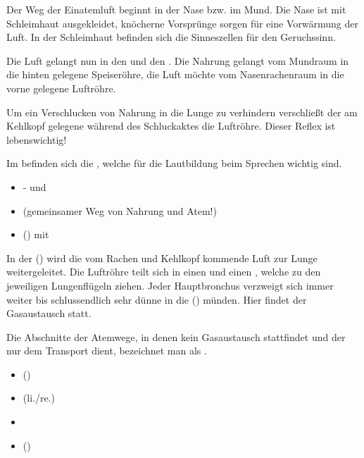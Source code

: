 {%
Der Weg der Einatemluft beginnt in der Nase bzw. im Mund. Die Nase ist
mit Schleimhaut ausgekleidet, knöcherne Vorsprünge sorgen für
eine Vorwärmung der Luft. In der Schleimhaut be\-finden sich die
Sinneszellen für den Geruchssinn. 


Die Luft gelangt nun in den  und den
.  Die Nahrung gelangt vom Mundraum in die
hinten gelegene Speiseröhre, die Luft möchte vom Nasen\-rachen\-raum in die vorne gelegene Luftröhre. 

Um ein Verschlucken von Nahrung in die Lunge zu verhindern
verschließt der am Kehlkopf gelegene 
während des Schluckaktes die Luftröhre. Dieser Reflex ist lebenswichtig! 

Im   befinden sich die ,
welche für die Lautbildung beim Sprechen wichtig sind.
}{%
\begin{itemize}
    \item {}- und   
    \item {} (gemeinsamer Weg von Nahrung und
    Atem!)  
    \item {} () mit
       
\end{itemize}
}{}{}{}

{%
In der  () wird die vom Rachen
und Kehlkopf kommende Luft zur Lunge weitergeleitet. Die Luftröhre teilt sich in einen
 und einen  ,
welche zu den jeweiligen Lungenflügeln ziehen. Jeder Hauptbronchus verzweigt sich immer weiter
bis schlussendlich sehr dünne  in die
 () münden. Hier findet
der Gasaustausch statt.

Die Abschnitte der Atemwege, in denen kein Gasaustausch
stattfindet und der nur dem Transport dient, bezeichnet man
als {\quotedblbase}.
}{%
\begin{itemize}
    \item {}
    ()
    \item {} (li./re.)
    \item {}
    \item {}
    ()
\end{itemize}
}{}{}{}



